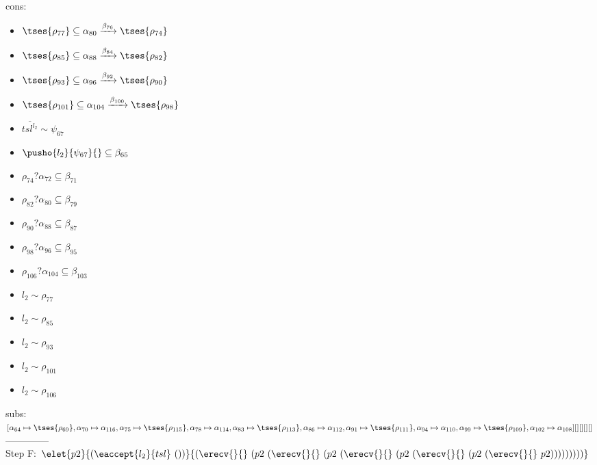 \documentclass[12pt]{article}
\begin{document}
\\  cons: \begin{itemize}
\item $  \tses{ \rho_{77}} \subseteq \alpha_{80} \xrightarrow{\beta_{76}}  \tses{ \rho_{74}} $
\item $  \tses{ \rho_{85}} \subseteq \alpha_{88} \xrightarrow{\beta_{84}}  \tses{ \rho_{82}} $
\item $  \tses{ \rho_{93}} \subseteq \alpha_{96} \xrightarrow{\beta_{92}}  \tses{ \rho_{90}} $
\item $  \tses{ \rho_{101}} \subseteq \alpha_{104} \xrightarrow{\beta_{100}}  \tses{ \rho_{98}} $
\item $ \overline{{tsl}^{l_{2}}} \sim\psi_{67} $
\item $ \pusho{ l_{2}} {\psi_{67}}{} \subseteq \beta_{65} $
\item $ \rho_{74}?\alpha_{72} \subseteq \beta_{71} $
\item $ \rho_{82}?\alpha_{80} \subseteq \beta_{79} $
\item $ \rho_{90}?\alpha_{88} \subseteq \beta_{87} $
\item $ \rho_{98}?\alpha_{96} \subseteq \beta_{95} $
\item $ \rho_{106}?\alpha_{104} \subseteq \beta_{103} $
\item $ l_{2} \sim\rho_{77} $
\item $ l_{2} \sim\rho_{85} $
\item $ l_{2} \sim\rho_{93} $
\item $ l_{2} \sim\rho_{101} $
\item $ l_{2} \sim\rho_{106} $
\end{itemize} 
  subs:  $ [ \alpha_{64}\mapsto \tses{ \rho_{69}}, \alpha_{70}\mapsto\alpha_{116}, \alpha_{75}\mapsto \tses{ \rho_{115}}, \alpha_{78}\mapsto\alpha_{114}, \alpha_{83}\mapsto \tses{ \rho_{113}}, \alpha_{86}\mapsto\alpha_{112}, \alpha_{91}\mapsto \tses{ \rho_{111}}, \alpha_{94}\mapsto\alpha_{110}, \alpha_{99}\mapsto \tses{ \rho_{109}}, \alpha_{102}\mapsto\alpha_{108}] [] [] [] [] $  
 \\--------------\\ 
Step F: $ \elet{p2}{(\eaccept{ l_{2} }{tsl}~())}{(\erecv{}{}~(p2~(\erecv{}{}~(p2~(\erecv{}{}~(p2~(\erecv{}{}~(p2~(\erecv{}{}~p2)))))))))} $
\end{document}
